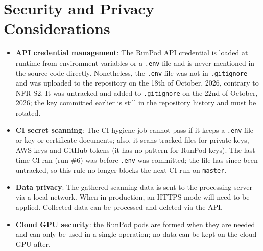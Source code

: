 \section{Security and Privacy Considerations}
\begin{itemize}
    \item \textbf{API credential management}: The RunPod API credential is loaded at runtime from environment variables or a \texttt{.env} file and is never mentioned in the source code directly. Nonetheless, the \texttt{.env} file was not in \texttt{.gitignore} and was uploaded to the repository on the 18th of October, 2026, contrary to NFR-S2. It was untracked and added to \texttt{.gitignore} on the 22nd of October, 2026; the key committed earlier is still in the repository history and must be rotated.
    \item \textbf{CI secret scanning}: The CI hygiene job cannot pass if it keeps a \texttt{.env} file or key or certificate documents; also, it scans tracked files for private keys, AWS keys and GitHub tokens (it has no pattern for RunPod keys). The last time CI ran (run \#6) was before \texttt{.env} was committed; the file has since been untracked, so this rule no longer blocks the next CI run on \texttt{master}.
    \item \textbf{Data privacy}: The gathered scanning data is sent to the processing server via a local network. When in production, an HTTPS mode will need to be applied. Collected data can be processed and deleted via the API.
    \item \textbf{Cloud GPU security}: the RunPod pods are formed when they are needed and can only be used in a single operation; no data can be kept on the cloud GPU after.
\end{itemize}

